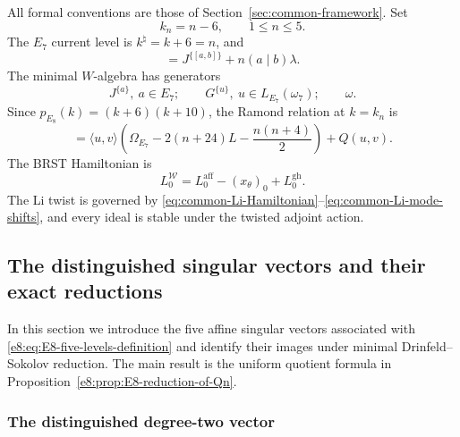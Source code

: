 \documentclass[11pt,reqno]{amsart}
\theoremstyle{definition}
\theoremstyle{remark}
\begin{document}
All formal conventions are those of Section~\ref{sec:common-framework}.  Set
\begin{equation}
 k_n=n-6,\qquad 1\le n\le5.
 \label{e8:eq:E8-five-levels-definition}
\end{equation}
The $E_7$ current level is $k^\natural=k+6=n$, and
\begin{equation}
 [J^{\{a\}}{}_{\lambda}J^{\{b\}}]
 =J^{\{[a,b]\}}+n(a\mid b)\lambda.
 \label{e8:eq:E8-E7-current-relation}
\end{equation}
The minimal $W$-algebra has generators
\begin{equation}
 J^{\{a\}},\ a\in E_7;
 \qquad G^{\{u\}},\ u\in L_{E_7}(\omega_7);
 \qquad \omega.
 \label{e8:eq:E8-minimal-W-generators}
\end{equation}
Since $p_{E_8}(k)=(k+6)(k+10)$, the Ramond relation at $k=k_n$ is
\begin{equation*}
 [u,v]=\langle u,v\rangle
 \left(\Omega_{E_7}-2(n+24)L-\frac{n(n+4)}2\right)+Q(u,v).
\end{equation*}
\label{e8:subsec:E8-exactness-delta-shifts}
The BRST Hamiltonian is
\begin{equation}
 L_0^{\mathcal W}=L_0^{\mathrm{aff}}-(x_\theta)_0+L_0^{\mathrm{gh}}.
 \label{e8:eq:E8-BRST-conformal-Hamiltonian}
\end{equation}
\label{e8:subsec:E8-Li-delta}
The Li twist is governed by
\eqref{eq:common-Li-Hamiltonian}--\eqref{eq:common-Li-mode-shifts}, and every
ideal is stable under the twisted adjoint action.

\subsection{The distinguished singular vectors and their exact reductions}


In this section we introduce the five affine singular vectors associated with
\eqref{e8:eq:E8-five-levels-definition} and identify their images under minimal
Drinfeld--Sokolov reduction.  The main result is the uniform quotient formula
in Proposition~\ref{e8:prop:E8-reduction-of-Qn}.

\subsubsection{The distinguished degree-two vector}
\end{document}
